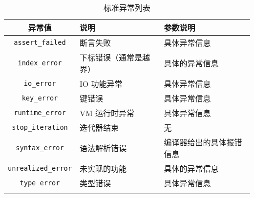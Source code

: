 \begin{table}[htb]
    \centering
    \setlength{\tabcolsep}{3mm}
    \begin{tabular}{cll} \Xhline{1pt}
        \textbf{异常值} & \textbf{说明} & \textbf{参数说明} \\ \hline
        \texttt{assert\_failed} & 断言失败 & 具体异常信息 \\
        \texttt{index\_error} & 下标错误（通常是越界） & 具体的异常信息 \\
        \texttt{io\_error} & IO 功能异常 & 具体异常信息 \\
        \texttt{key\_error} & 键错误 & 具体异常信息 \\
        \texttt{runtime\_error} & VM 运行时异常 & 具体异常信息 \\
        \texttt{stop\_iteration} & 迭代器结束 & 无 \\
        \texttt{syntax\_error} & 语法解析错误 & 编译器给出的具体报错信息 \\
        \texttt{unrealized\_error} & 未实现的功能 & 具体的异常信息 \\
        \texttt{type\_error} & 类型错误 & 具体异常信息 \\
        \Xhline{1pt}
    \end{tabular}
    \caption{标准异常列表}
    \label{tab::stdexpect_list}
\end{table}
